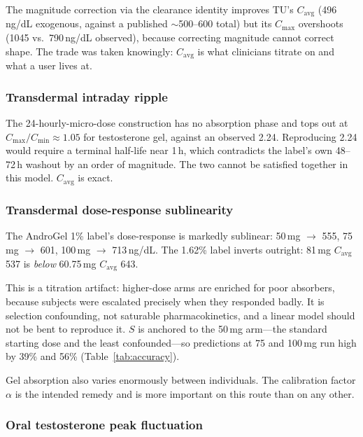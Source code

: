\documentclass[11pt,a4paper]{article}
\begin{document}
The magnitude correction via the clearance identity improves TU's
$C_{\mathrm{avg}}$ (496\,ng/dL exogenous, against a published
$\sim$500--600 total) but its $C_{\max}$ overshoots (1045 vs.\ 790\,ng/dL
observed), because correcting magnitude cannot correct shape. The trade
was taken knowingly: $C_{\mathrm{avg}}$ is what clinicians titrate on
and what a user lives at.

\subsubsection{Transdermal intraday ripple}
\label{sec:td_ripple}

The 24-hourly-micro-dose construction has no absorption phase and tops
out at $C_{\max}/C_{\min} \approx 1.05$ for testosterone gel, against an
observed 2.24. Reproducing 2.24 would require a terminal half-life near
1\,h, which contradicts the label's own 48--72\,h washout by an order of
magnitude. The two cannot be satisfied together in this model.
$C_{\mathrm{avg}}$ is exact.

\subsubsection{Transdermal dose-response sublinearity}
\label{sec:td_dose_response}

The AndroGel 1\% label's dose-response is markedly sublinear:
50\,mg $\to$ 555, 75\,mg $\to$ 601, 100\,mg $\to$ 713\,ng/dL. The 1.62\%
label inverts outright: 81\,mg $C_{\mathrm{avg}}$ 537 is \emph{below}
60.75\,mg $C_{\mathrm{avg}}$ 643.

This is a titration artifact: higher-dose arms are enriched for poor
absorbers, because subjects were escalated precisely when they responded
badly. It is selection confounding, not saturable pharmacokinetics, and
a linear model should not be bent to reproduce it. $S$ is anchored to
the 50\,mg arm---the standard starting dose and the least
confounded---so predictions at 75 and 100\,mg run high by 39\% and 56\%
(Table~\ref{tab:accuracy}).

Gel absorption also varies enormously between individuals. The
calibration factor $\alpha$ is the intended remedy and is more important
on this route than on any other.

\subsubsection{Oral testosterone peak fluctuation}
\label{sec:oral_t_limitation}
\end{document}
